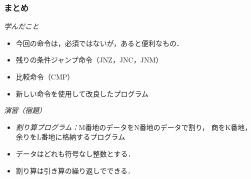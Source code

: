 \documentclass{beamer}                 %
\begin{document}
\begin{frame}
  \frametitle{まとめ}
  \emph{学んだこと}
  \begin{itemize}
  \item 今回の命令は，必須ではないが，あると便利なもの．
  \item 残りの条件ジャンプ命令（JNZ，JNC，JNM）
  \item 比較命令（CMP）
  \item 新しい命令を使用して改良したプログラム
  \end{itemize}
  \vfill

  \emph{演習（宿題）}
  \begin{itemize}
  \item \emph{割り算プログラム：}M番地のデータをN番地のデータで割り，
    商をK番地，余りをL番地に格納するプログラム
  \item データはどれも符号なし整数とする．
  \item 割り算は引き算の繰り返しでできる．
  \end{itemize}
  \vfill
\end{frame}
\end{document}
